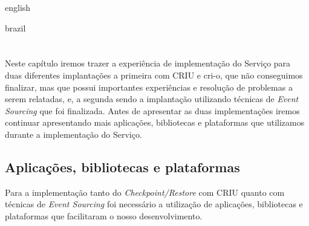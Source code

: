 

\begin{otherlanguage*}{english}


\begin{otherlanguage*}{brazil}

\chapter{} \label{cap:implementacao:servico}

Neste capítulo iremos trazer a experiência de implementação do Serviço para duas
diferentes implantações a primeira com CRIU e cri-o, que não conseguimos finalizar,
mas que possui importantes experiências e resolução de problemas a serem relatadas, e,
a segunda sendo a implantação utilizando técnicas de \textit{Event Sourcing} que foi
finalizada. Antes de apresentar as duas implementações iremos continuar apresentando
mais aplicações, bibliotecas e plataformas que utilizamos durante a implementação do
Serviço.

\section{Aplicações, bibliotecas e plataformas}

Para a implementação tanto do \textit{Checkpoint/Restore} com CRIU quanto com técnicas
de \textit{Event Sourcing} foi necessário a utilização de aplicações, bibliotecas e
plataformas que facilitaram o nosso desenvolvimento.


\end{otherlanguage*}
\end{otherlanguage*}
